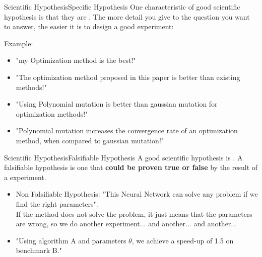 \begin{frame}{Scientific Hypothesis}{Specific Hypothesis}
  One characteristic of good scientific hypothesis is that they are . The more detail you give to the question you want to answer, the easier it is to design a good experiment:\bigskip

  Example:
  \begin{itemize}
    \item "my Optimization method is the best!"
    \item "The optimization method proposed in this paper is better than existing methods!"
    \item "Using Polynomial mutation is better than gaussian mutation for optimization methods!"
    \item "Polynomial mutation increases the convergence rate of an optimization method, when compared to gaussian mutation!"
  \end{itemize}
\end{frame}

\begin{frame}{Scientific Hypothesis}{Falsifiable Hypothesis}
  A good scientific hypothesis is . A falsifiable hypothesis is one that {\bf could be proven true or false} by the result of a experiment.\bigskip


  \begin{itemize}
    \item \alert{Non Falsifiable Hypothesis:} "This Neural Network can solve any problem if we find the right parameters".\\
    {\smaller
    If the method does not solve the problem, it just means that the parameters are wrong, so we do another experiment... and another... and another...}\bigskip

    \item {} "Using algorithm A and parameters $\theta$, we achieve a speed-up of 1.5 on benchmark B."
  \end{itemize}\bigskip
\end{frame}

